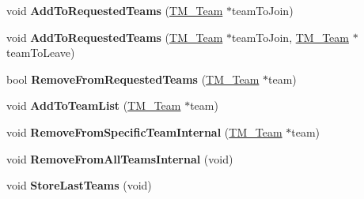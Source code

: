 \begin{DoxyCompactItemize}
\item 
\hypertarget{class_rak_net_1_1_t_m___team_member_a5107c778146ffd7ef47119938301cc5d}{void {\bfseries Add\-To\-Requested\-Teams} (\hyperlink{class_rak_net_1_1_t_m___team}{T\-M\-\_\-\-Team} $\ast$team\-To\-Join)}\label{class_rak_net_1_1_t_m___team_member_a5107c778146ffd7ef47119938301cc5d}

\item 
\hypertarget{class_rak_net_1_1_t_m___team_member_a29daca5ea3b45b2f5dd6e76f45ca7f51}{void {\bfseries Add\-To\-Requested\-Teams} (\hyperlink{class_rak_net_1_1_t_m___team}{T\-M\-\_\-\-Team} $\ast$team\-To\-Join, \hyperlink{class_rak_net_1_1_t_m___team}{T\-M\-\_\-\-Team} $\ast$team\-To\-Leave)}\label{class_rak_net_1_1_t_m___team_member_a29daca5ea3b45b2f5dd6e76f45ca7f51}

\item 
\hypertarget{class_rak_net_1_1_t_m___team_member_a5328f4a2dff787ded92ac648b0824a9c}{bool {\bfseries Remove\-From\-Requested\-Teams} (\hyperlink{class_rak_net_1_1_t_m___team}{T\-M\-\_\-\-Team} $\ast$team)}\label{class_rak_net_1_1_t_m___team_member_a5328f4a2dff787ded92ac648b0824a9c}

\item 
\hypertarget{class_rak_net_1_1_t_m___team_member_a3b80e12f949c469b49633f1388edcb62}{void {\bfseries Add\-To\-Team\-List} (\hyperlink{class_rak_net_1_1_t_m___team}{T\-M\-\_\-\-Team} $\ast$team)}\label{class_rak_net_1_1_t_m___team_member_a3b80e12f949c469b49633f1388edcb62}

\item 
\hypertarget{class_rak_net_1_1_t_m___team_member_afd749568000cbec2ac55a3ba820c2114}{void {\bfseries Remove\-From\-Specific\-Team\-Internal} (\hyperlink{class_rak_net_1_1_t_m___team}{T\-M\-\_\-\-Team} $\ast$team)}\label{class_rak_net_1_1_t_m___team_member_afd749568000cbec2ac55a3ba820c2114}

\item 
\hypertarget{class_rak_net_1_1_t_m___team_member_a4892de9d8ce38b5b61ffe0e2213e8fdc}{void {\bfseries Remove\-From\-All\-Teams\-Internal} (void)}\label{class_rak_net_1_1_t_m___team_member_a4892de9d8ce38b5b61ffe0e2213e8fdc}

\item 
\hypertarget{class_rak_net_1_1_t_m___team_member_adc49c74fb252c6716662e63994568b0a}{void {\bfseries Store\-Last\-Teams} (void)}\label{class_rak_net_1_1_t_m___team_member_adc49c74fb252c6716662e63994568b0a}

\end{DoxyCompactItemize}
